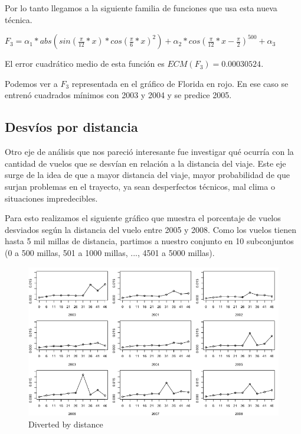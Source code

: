 \documentclass{endm}
\begin{document}
Por lo tanto llegamos a la siguiente familia de funciones que usa esta nueva t\'ecnica.

$F_3 = \alpha_1 * abs(sin(\frac{\pi}{12}*x) * cos(\frac{\pi}{6}*x)^2) + \alpha_2 * cos(\frac{\pi}{12}*x - \frac{\pi}{2})^{500} + \alpha_3$

El error cuadr\'atico medio de esta funci\'on es $ECM(F_3) = 0.00030524$.

Podemos ver a $F_3$ representada en el gr\'afico de Florida en rojo. En ese caso se entren\'o cuadrados m\'inimos con 2003 y 2004 y se predice 2005.

\subsection{Desv\'ios por distancia}

Otro eje de an\'alisis que nos pareci\'o interesante fue investigar qu\'e ocurr\'ia con la cantidad de vuelos que se desv\'ian en relaci\'on a la distancia del viaje. Este eje surge de la idea de que a mayor distancia del viaje, mayor probabilidad de que surjan problemas en el trayecto, ya sean desperfectos t\'ecnicos, mal clima o situaciones impredecibles.

Para esto realizamos el siguiente gr\'afico que muestra el porcentaje de vuelos desviados seg\'un la distancia del vuelo entre 2005 y 2008. Como los vuelos tienen hasta 5 mil millas de distancia, partimos a nuestro conjunto en 10 subconjuntos (0 a 500 millas, 501 a 1000 millas, ..., 4501 a 5000 millas).

\begin{figure}[h!]
  \begin{center}
	\includegraphics[scale=0.4]{img/diverted_by_distance.png}
	\caption{Diverted by distance}
  \end{center}
\end{figure}
\end{document}

